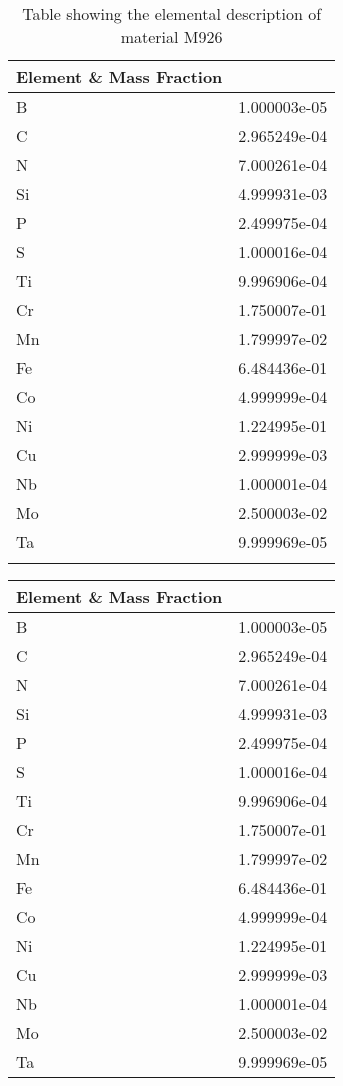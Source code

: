 \begin{centering}
\begin{longtable}[ht!]
\caption{Table showing the elemental description of material M922}
\label{table:material_EppDT}
\end{longtable}
\clearpage

\begin{longtable}[ht!]
{ p{} | p{} }
\hline
Element \& Mass Fraction\\
\hline
B &  1.000003e-05\\
C &  2.965249e-04\\
N &  7.000261e-04\\
Si &  4.999931e-03\\
P &  2.499975e-04\\
S &  1.000016e-04\\
Ti &  9.996906e-04\\
Cr &  1.750007e-01\\
Mn &  1.799997e-02\\
Fe &  6.484436e-01\\
Co &  4.999999e-04\\
Ni &  1.224995e-01\\
Cu &  2.999999e-03\\
Nb &  1.000001e-04\\
Mo &  2.500003e-02\\
Ta &  9.999969e-05\\

\caption{Table showing the elemental description of material M926}
\label{table:material_PPWheels}
\end{longtable}
\clearpage

\begin{longtable}[ht!]
{ p{} | p{} }
\hline
Element \& Mass Fraction\\
\hline
B &  1.000003e-05\\
C &  2.965249e-04\\
N &  7.000261e-04\\
Si &  4.999931e-03\\
P &  2.499975e-04\\
S &  1.000016e-04\\
Ti &  9.996906e-04\\
Cr &  1.750007e-01\\
Mn &  1.799997e-02\\
Fe &  6.484436e-01\\
Co &  4.999999e-04\\
Ni &  1.224995e-01\\
Cu &  2.999999e-03\\
Nb &  1.000001e-04\\
Mo &  2.500003e-02\\
Ta &  9.999969e-05\\


\end{longtable}
\end{centering}
